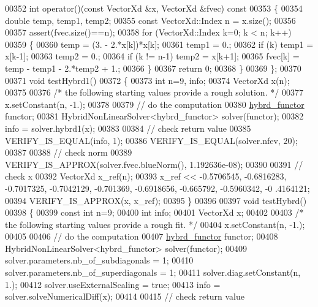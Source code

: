 \begin{DoxyCode}
00352     \textcolor{keywordtype}{int} operator()(\textcolor{keyword}{const} VectorXd &x, VectorXd &fvec)\textcolor{keyword}{ const}
00353 \textcolor{keyword}{    }\{
00354         \textcolor{keywordtype}{double} temp, temp1, temp2;
00355         \textcolor{keyword}{const} VectorXd::Index n = x.size();
00356 
00357         assert(fvec.size()==n);
00358         \textcolor{keywordflow}{for} (VectorXd::Index k=0; k < n; k++)
00359         \{
00360             temp = (3. - 2.*x[k])*x[k];
00361             temp1 = 0.;
00362             \textcolor{keywordflow}{if} (k) temp1 = x[k-1];
00363             temp2 = 0.;
00364             \textcolor{keywordflow}{if} (k != n-1) temp2 = x[k+1];
00365             fvec[k] = temp - temp1 - 2.*temp2 + 1.;
00366         \}
00367         \textcolor{keywordflow}{return} 0;
00368     \}
00369 \};
00370 
00371 \textcolor{keywordtype}{void} testHybrd1()
00372 \{
00373   \textcolor{keywordtype}{int} n=9, info;
00374   VectorXd x(n);
00375 
00376   \textcolor{comment}{/* the following starting values provide a rough solution. */}
00377   x.setConstant(n, -1.);
00378 
00379   \textcolor{comment}{// do the computation}
00380   \hyperlink{structhybrd__functor}{hybrd\_functor} functor;
00381   HybridNonLinearSolver<hybrd\_functor> solver(functor);
00382   info = solver.hybrd1(x);
00383 
00384   \textcolor{comment}{// check return value}
00385   VERIFY\_IS\_EQUAL(info, 1);
00386   VERIFY\_IS\_EQUAL(solver.nfev, 20);
00387 
00388   \textcolor{comment}{// check norm}
00389   VERIFY\_IS\_APPROX(solver.fvec.blueNorm(), 1.192636e-08);
00390 
00391   \textcolor{comment}{// check x}
00392   VectorXd x\_ref(n);
00393   x\_ref << -0.5706545, -0.6816283, -0.7017325, -0.7042129, -0.701369, -0.6918656, -0.665792, -0.5960342, -0
      .4164121;
00394   VERIFY\_IS\_APPROX(x, x\_ref);
00395 \}
00396 
00397 \textcolor{keywordtype}{void} testHybrd()
00398 \{
00399   \textcolor{keyword}{const} \textcolor{keywordtype}{int} n=9;
00400   \textcolor{keywordtype}{int} info;
00401   VectorXd x;
00402 
00403   \textcolor{comment}{/* the following starting values provide a rough fit. */}
00404   x.setConstant(n, -1.);
00405 
00406   \textcolor{comment}{// do the computation}
00407   \hyperlink{structhybrd__functor}{hybrd\_functor} functor;
00408   HybridNonLinearSolver<hybrd\_functor> solver(functor);
00409   solver.parameters.nb\_of\_subdiagonals = 1;
00410   solver.parameters.nb\_of\_superdiagonals = 1;
00411   solver.diag.setConstant(n, 1.);
00412   solver.useExternalScaling = \textcolor{keyword}{true};
00413   info = solver.solveNumericalDiff(x);
00414 
00415   \textcolor{comment}{// check return value}

\end{DoxyCode}
